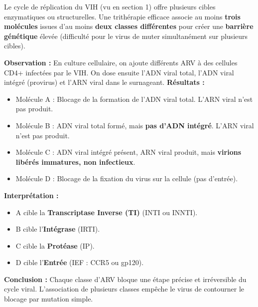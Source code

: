 \documentclass[11pt]{article}
\begin{document}
Le cycle de réplication du VIH (vu en section 1) offre plusieurs cibles enzymatiques ou structurelles. Une trithérapie efficace associe au moins \textbf{trois molécules} issues d'au moins \textbf{deux classes différentes} pour créer une \textbf{barrière génétique} élevée (difficulté pour le virus de muter simultanément sur plusieurs cibles).

\begin{experience}
\textbf{Observation :} En culture cellulaire, on ajoute différents ARV à des cellules CD4+ infectées par le VIH. On dose ensuite l'ADN viral total, l'ADN viral intégré (provirus) et l'ARN viral dans le surnageant.
\textbf{Résultats :}
\begin{itemize}
    \item Molécule A : Blocage de la formation de l'ADN viral total. L'ARN viral n'est pas produit.
    \item Molécule B : ADN viral total formé, mais \textbf{pas d'ADN intégré}. L'ARN viral n'est pas produit.
    \item Molécule C : ADN viral intégré présent, ARN viral produit, mais \textbf{virions libérés immatures, non infectieux}.
    \item Molécule D : Blocage de la fixation du virus sur la cellule (pas d'entrée).
\end{itemize}
\textbf{Interprétation :}
\begin{itemize}
    \item A cible la \textbf{Transcriptase Inverse (TI)} (INTI ou INNTI).
    \item B cible l'\textbf{Intégrase} (IRTI).
    \item C cible la \textbf{Protéase} (IP).
    \item D cible l'\textbf{Entrée} (IEF : CCR5 ou gp120).
\end{itemize}
\textbf{Conclusion :} Chaque classe d'ARV bloque une étape précise et irréversible du cycle viral. L'association de plusieurs classes empêche le virus de contourner le blocage par mutation simple.
\end{experience}
\end{document}
